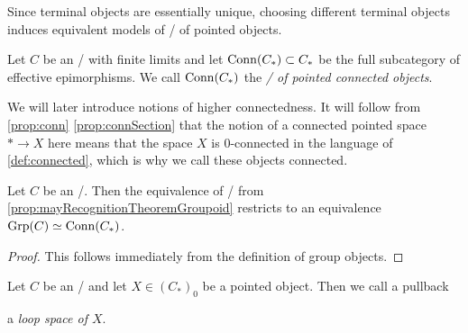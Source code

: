 \begin{remark}
    Since terminal objects are essentially unique, choosing different terminal objects induces equivalent models of \inftycats/ of pointed objects.
\end{remark}
\begin{definition}\label{def:catOfPtdConnObj}
    Let $C$ be an \inftycat/ with finite limits and let $\operatorname{Conn}(C_*)\subset C_*$ be the full subcategory of effective epimorphisms.
    We call $\operatorname{Conn}(C_*)$ the \emph{\inftycat/ of pointed connected objects}.
\end{definition}
\begin{remark}
    We will later introduce notions of higher connectedness. 
    It will follow from \cref{prop:conn} \ref{prop:connSection} that the notion of a connected pointed space $*\to X$ here means that the space $X$ is $0$-connected in the language of \cref{def:connected}, which is why we call these objects connected.
\end{remark}
\begin{corollary}\label{prop:mayRecognitionTheoremGroup}
    Let $C$ be an \inftytop/. 
    Then the equivalence of \inftycats/ from \cref{prop:mayRecognitionTheoremGroupoid} restricts to an equivalence $\operatorname{Grp}(C)\simeq\operatorname{Conn}(C_*)$.
    \begin{proof}
        This follows immediately from the definition of group objects.
    \end{proof}
\end{corollary}
\begin{definition}\label{def:loopSpace}
    Let $C$ be an \inftytop/ and let $X\in\left(C_*\right)_0$ be a pointed object.
    Then we call a pullback
    \begin{center}
    \end{center}
    a \emph{loop space of $X$}.
\end{definition}

